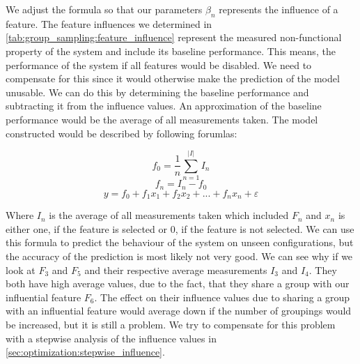 \documentclass[../../thesis.tex]{subfiles}
\begin{document}
We adjust the formula so that our parameters $\beta_n$ represents the influence of a feature.
The feature influences we determined in \autoref{tab:group_sampling:feature_influence}
represent the measured non-functional property of the system and include its baseline performance.
This means, the performance of the system if all features would be disabled.
We need to compensate for this since it would otherwise make the prediction of the model unusable.
We can do this by determining the baseline performance and subtracting it from the influence values.
An approximation of the baseline performance would be the average of all measurements taken.
The model constructed would be described by following forumlas:

\begin{equation}
    f_0 = \frac{1}{n}\sum_{n=1}^{|I|}I_n
\end{equation}\label{eq:group_sampling:intercept}
\begin{equation}
    f_n = I_n - f_0
\end{equation}\label{eq:group_sampling:coefficient}
\begin{equation}
    y = f_0 + f_1 x_1 + f_2 x_2 + ... + f_n x_n + \varepsilon
\end{equation}


Where $I_n$ is the average of all measurements taken which included $F_n$ and $x_n$ is either one, if the feature is selected
or 0, if the feature is not selected.
We can use this formula to predict the behaviour of the system on unseen configurations, but the accuracy
of the prediction is most likely not very good. We can see why if we look at $F_3$ and $F_5$ and their
respective average measurements $I_3$ and $I_4$. They both have high average values, due to the fact, that they
share a group with our influential feature $F_6$. The effect on their influence values due to sharing
a group with an influential feature would average down if the number of groupings would be increased, but
it is still a problem. We try to compensate for this problem with a stepwise analysis of the influence values
in \autoref{sec:optimization:stepwise_influence}.

\end{document}
